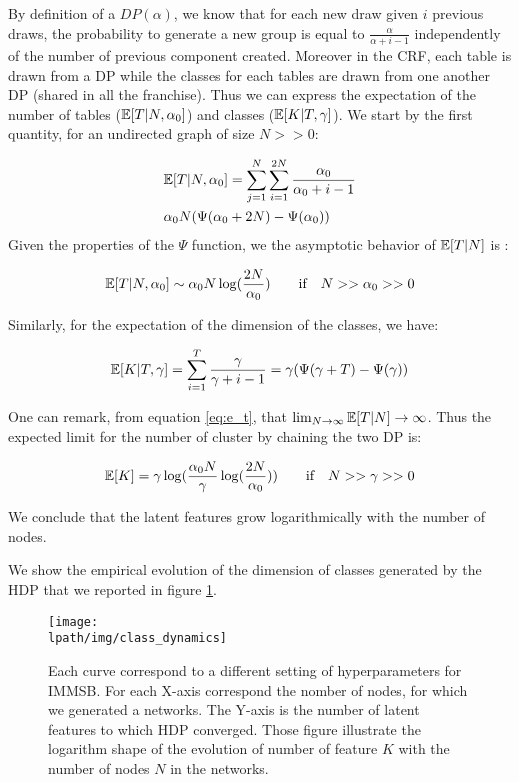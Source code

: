 By definition of a \(DP(\alpha)\), we know that for each new draw given
\(i\) previous draws, the probability to generate a new group is equal
to \(\frac{\alpha}{\alpha +i-1}\) independently of the number of previous
component created. Moreover in the CRF, each table is drawn from a DP while the classes for each tables are drawn from one another DP (shared in all the franchise). Thus we can express the expectation of the number of tables ($\mathbb{E}[T|N, \alpha_0]$) and classes ($\mathbb{E}[K|T, \gamma]$). We start by the first quantity, for an undirected graph of size $N >> 0$:

\begin{align*}
&\mathbb{E}[T|N, \alpha_0] = \sum_{j=1}^N\sum_{i=1}^{2N} \frac{\alpha_0}{\alpha_0 +i-1} \\
& \alpha_0 N (\Psi(\alpha_0+2N) - \Psi(\alpha_0))
\end{align*}
Given the properties of the $\Psi$ function, we the asymptotic behavior of $\mathbb{E}[T|N]$ is :

\begin{equation*} \label{eq:e_t}
\E[T|N, \alpha_0] \sim \alpha_0 N \log(\frac{2N}{\alpha_0}) \qquad \text{if} \quad N >> \alpha_0 >> 0
\end{equation*}

Similarly, for the expectation of the dimension of the classes, we have:

\begin{equation*}
\mathbb{E}[K|T, \gamma] = \sum_{i=1}^{T} \frac{\gamma}{\gamma +i-1} = \gamma (\Psi(\gamma+T) - \Psi(\gamma))
\end{equation*}

One can remark, from equation \eqref{eq:e_t}, that $\lim_{N\to\infty} \mathbb{E}[T|N] \to  \infty$. Thus the expected limit for the number of cluster by chaining the two DP is:

\begin{equation*}
\mathbb{E}[K] = \gamma \log(\frac{\alpha_0 N}{\gamma}\log(\frac{2N}{\alpha_0} )) \qquad \textnormal{if} \quad N >> \gamma>>0
\end{equation*}

We conclude that the latent features grow logarithmically with the number of nodes.

We show the empirical evolution of the dimension of classes generated by the HDP that we reported in figure \ref{fig:gen_dyn}. 

\begin{figure}[h]
	\centering
	
	\texttt{[image: \\lpath/img/class\_dynamics]}

	\caption{Each curve correspond to a different setting of hyperparameters for IMMSB. For each X-axis correspond the nomber of nodes, for which we generated a networks. The Y-axis is the number of latent features to which HDP converged. Those figure illustrate the logarithm shape of the evolution of number of feature $K$ with the number of nodes $N$ in the networks.}
	\label{fig:gen_dyn}
\end{figure}

